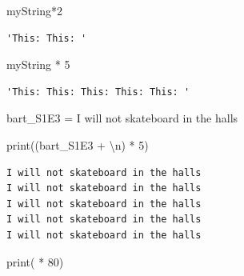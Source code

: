 \documentclass[
  letterpaper,
  DIV=11,
  numbers=noendperiod]{scrreprt}
\newenvironment{Shaded}{\begin{snugshade}}{\end{snugshade}}
\newcommand{\BuiltInTok}[1]{\textcolor[rgb]{0.00,0.23,0.31}{#1}}
\newcommand{\CharTok}[1]{\textcolor[rgb]{0.13,0.47,0.30}{#1}}
\newcommand{\DecValTok}[1]{\textcolor[rgb]{0.68,0.00,0.00}{#1}}
\newcommand{\NormalTok}[1]{\textcolor[rgb]{0.00,0.23,0.31}{#1}}
\newcommand{\OperatorTok}[1]{\textcolor[rgb]{0.37,0.37,0.37}{#1}}
\newcommand{\StringTok}[1]{\textcolor[rgb]{0.13,0.47,0.30}{#1}}
\begin{document}
\begin{Shaded}
\begin{Highlighting}[]
\NormalTok{myString}\OperatorTok{*}\DecValTok{2}                     
\end{Highlighting}
\end{Shaded}

\begin{verbatim}
'This: This: '
\end{verbatim}

\begin{Shaded}
\begin{Highlighting}[]
\NormalTok{myString }\OperatorTok{*} \DecValTok{5}
\end{Highlighting}
\end{Shaded}

\begin{verbatim}
'This: This: This: This: This: '
\end{verbatim}

\begin{Shaded}
\begin{Highlighting}[]
\NormalTok{bart\_S1E3 }\OperatorTok{=} \StringTok{\textquotesingle{}I will not skateboard in the halls\textquotesingle{}}
\end{Highlighting}
\end{Shaded}

\begin{Shaded}
\begin{Highlighting}[]
\BuiltInTok{print}\NormalTok{((bart\_S1E3 }\OperatorTok{+} \StringTok{\textquotesingle{}}\CharTok{\textbackslash{}n}\StringTok{\textquotesingle{}}\NormalTok{) }\OperatorTok{*} \DecValTok{5}\NormalTok{)}
\end{Highlighting}
\end{Shaded}

\begin{verbatim}
I will not skateboard in the halls
I will not skateboard in the halls
I will not skateboard in the halls
I will not skateboard in the halls
I will not skateboard in the halls
\end{verbatim}

\begin{Shaded}
\begin{Highlighting}[]
\BuiltInTok{print}\NormalTok{(}\StringTok{\textquotesingle{}{-}\textquotesingle{}} \OperatorTok{*} \DecValTok{80}\NormalTok{)}
\end{Highlighting}
\end{Shaded}
\end{document}
